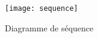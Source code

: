 \begin{figure}[ht]
    \centering
    \caption{Diagramme de séquence}
    \texttt{[image: sequence]}
    \label{fig:sequence-diagram}
\end{figure}
\pagebreak